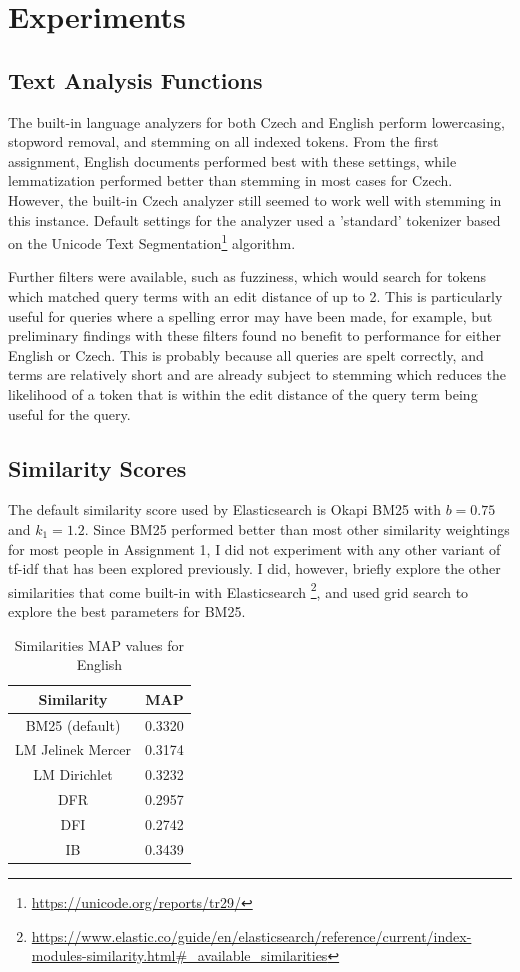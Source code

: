 \documentclass[a4paper]{article}
\begin{document}
\section{Experiments}

\subsection{Text Analysis Functions}
\label{sec:text-analysis}
The built-in language analyzers for both Czech and English perform lowercasing,
stopword removal, and stemming on all indexed tokens. From the first assignment,
English documents performed best with these settings, while lemmatization
performed better than stemming in most cases for Czech. However, the built-in
Czech analyzer still seemed to work well with stemming in this instance. Default
settings for the analyzer used a 'standard' tokenizer based on the Unicode Text
Segmentation\footnote{\url{https://unicode.org/reports/tr29/}} algorithm. 

Further filters were available, such as fuzziness, which would search for tokens
which matched query terms with an edit distance of up to 2. This is particularly
useful for queries where a spelling error may have been made, for example, but
preliminary findings with these filters found no benefit to performance for
either English or Czech. This is probably because all queries are spelt
correctly, and terms are relatively short and are already subject to stemming
which reduces the likelihood of a token that is within the edit distance of the
query term being useful for the query.


\subsection{Similarity Scores}
\label{sec:similarity}
The default similarity score used by Elasticsearch is Okapi BM25 with $b=0.75$
and $k_1 = 1.2$. Since BM25 performed better than most other similarity
weightings for most people in Assignment 1, I did not experiment with any other
variant of tf-idf that has been explored previously. I did, however, briefly
explore the other similarities that come built-in with Elasticsearch
\footnote{\url{https://www.elastic.co/guide/en/elasticsearch/reference/current/index-modules-similarity.html\#_available_similarities}},
and used grid search to explore the best parameters for BM25.

\begin{table}[htpb]
    \centering
    \caption{Similarities MAP values for English}
    \label{tab:similarities}
    \begin{tabular}{c|c}
    Similarity & MAP \\
    \hline
    BM25 (default) & 0.3320 \\
    LM Jelinek Mercer & 0.3174 \\
    LM Dirichlet & 0.3232 \\
    DFR & 0.2957 \\
    DFI & 0.2742 \\
    IB & 0.3439
    \end{tabular}
\end{table}
\end{document}
